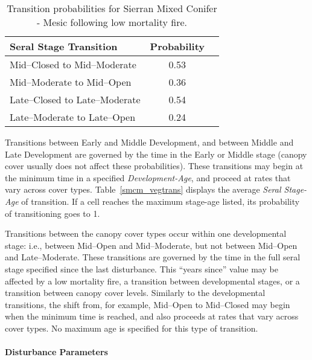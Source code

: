 \begin{table}[!htbp]
\small
\centering
\caption{Transition probabilities for Sierran Mixed Conifer - Mesic following low mortality fire.}
\label{smcm_firetrans}
\begin{tabular}{lcc}
\hline
\textbf{Seral Stage Transition} & \textbf{Probability}\\
\hline
Mid--Closed to Mid--Moderate     	& 0.53   	\\
Mid--Moderate to Mid--Open    	& 0.36		\\
Late--Closed to Late--Moderate	& 0.54    \\
Late--Moderate to Late--Open     	& 0.24    \\
\hline
\end{tabular}
\end{table}

Transitions between Early and Middle Development, and between Middle and Late Development are governed by the time in the Early or Middle stage (canopy cover usually does not affect these probabilities). These transitions may begin at the minimum time in a specified \emph{Development-Age}, and proceed at rates that vary across cover types. Table~\ref{smcm_vegtrans} displays the average \emph{Seral Stage-Age} of transition. If a cell reaches the maximum stage-age listed, its probability of transitioning goes to 1. 

Transitions between the canopy cover types occur within one developmental stage: i.e., between Mid--Open and Mid--Moderate, but not between Mid--Open and Late--Moderate. These transitions are governed by the time in the full seral stage specified since the last disturbance. This ``years since'' value may be affected by a low mortality fire, a transition between developmental stages, or a transition between canopy cover levels. Similarly to the developmental transitions, the shift from, for example, Mid--Open to Mid--Closed may begin when the minimum time is reached, and also proceeds at rates that vary across cover types. No maximum age is specified for this type of transition.

\paragraph{Disturbance Parameters} 
\label{subsubsec:distparams}

